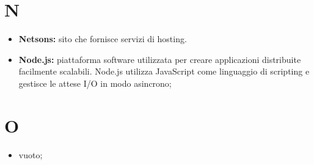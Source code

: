 \section*{N} %
\label{sec:n}
	\begin{itemize}
		\item \textbf{Netsons:} sito che fornisce servizi di hosting.
		\item \textbf{Node.js:} piattaforma software utilizzata per creare applicazioni distribuite facilmente scalabili. Node.js utilizza JavaScript come linguaggio di scripting e gestisce le attese I/O in modo asincrono;
	\end{itemize}
\pagebreak

\section*{O} %
\label{sec:o}
	\begin{itemize}
		\item vuoto;
	\end{itemize}
\pagebreak
